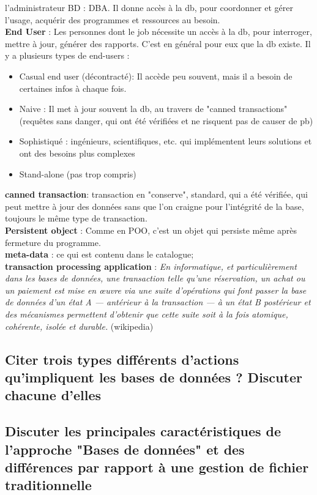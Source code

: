 l'administrateur BD : DBA. 
Il donne accès à la db, pour coordonner et gérer l'usage, acquérir des programmes 
et ressources au besoin. \\
\textbf{End User} : Les personnes dont le job nécessite un accès à la db, 
pour interroger, mettre à jour, générer des rapports. C'est en général 
pour eux que la db existe. Il y a plusieurs types de end-users :
\begin{itemize}
	\item Casual end user (décontracté): Il accède peu souvent, mais il a besoin de certaines infos à chaque fois.
	\item Naive : Il met à jour souvent la db, au travers de "canned transactions" 
	(requêtes sans danger, qui ont été vérifiées et ne risquent pas de causer de pb)
	\item Sophistiqué : ingénieurs, scientifiques, etc. qui implémentent leurs solutions 
	et ont des besoins plus complexes
	\item Stand-alone (pas trop compris)
\end{itemize}
\textbf{canned transaction}: transaction en "conserve", standard, qui a été vérifiée, qui peut mettre à jour des données sans que l'on craigne pour l'intégrité de la base, toujours le même type de transaction.\\
\textbf{Persistent object} : Comme en POO, c'est un objet qui persiste 
même après fermeture du programme. \\
\textbf{meta-data} : ce qui est contenu dans le catalogue;\\
\textbf{transaction processing application} :
\textit{En informatique, et particulièrement dans les bases de données, 
une transaction telle qu'une réservation, un achat ou un paiement est mise en 
œuvre via une suite d'opérations qui font passer la base de données d'un état A 
 — antérieur à la transaction — à un état B postérieur et des mécanismes  permettent d'obtenir que cette suite soit à la fois atomique, cohérente, isolée et durable.} (wikipedia)

\subsection{Citer trois types différents d'actions qu'impliquent les bases de données ? Discuter chacune d'elles}




\subsection{Discuter les principales caractéristiques de l'approche "Bases de données" et des différences par rapport à une gestion de fichier traditionnelle}

